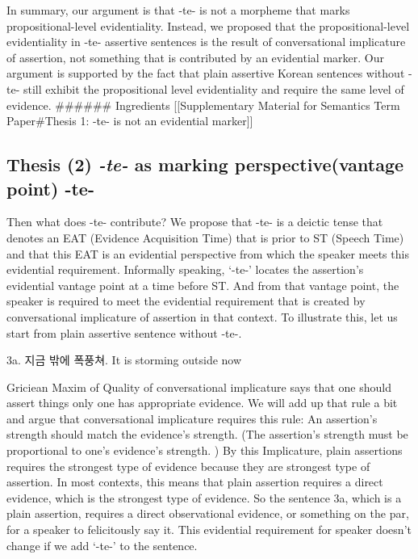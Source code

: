 In summary, our argument is that -te- is not a morpheme that marks
propositional-level evidentiality. Instead, we proposed that the
propositional-level evidentiality in -te- assertive sentences is the
result of conversational implicature of assertion, not something that is
contributed by an evidential marker. Our argument is supported by the
fact that plain assertive Korean sentences without -te- still exhibit
the propositional level evidentiality and require the same level of
evidence. \#\#\#\#\#\# Ingredients {[}{[}Supplementary Material for
Semantics Term Paper\#Thesis 1: -te- is not an evidential marker{]}{]}

\hypertarget{thesis-2--te--as-marking-perspectivevantage-point--te-}{%
\subsection{\texorpdfstring{Thesis (2) \emph{-te-} as marking
perspective(vantage point)
-te-}{Thesis (2) -te- as marking perspective(vantage point) -te-}}\label{thesis-2--te--as-marking-perspectivevantage-point--te-}}

Then what does -te- contribute? We propose that -te- is a deictic tense
that denotes an EAT (Evidence Acquisition Time) that is prior to ST
(Speech Time) and that this EAT is an evidential perspective from which
the speaker meets this evidential requirement. Informally speaking,
`-te-' locates the assertion's evidential vantage point at a time before
ST. And from that vantage point, the speaker is required to meet the
evidential requirement that is created by conversational implicature of
assertion in that context. To illustrate this, let us start from plain
assertive sentence without -te-.

3a. 지금 밖에 폭풍쳐. It is storming outside now

Griciean Maxim of Quality of conversational implicature says that one
should assert things only one has appropriate evidence. We will add up
that rule a bit and argue that conversational implicature requires this
rule: An assertion's strength should match the evidence's strength. (The
assertion's strength must be proportional to one's evidence's strength.
) By this Implicature, plain assertions requires the strongest type of
evidence because they are strongest type of assertion. In most contexts,
this means that plain assertion requires a direct evidence, which is the
strongest type of evidence. So the sentence 3a, which is a plain
assertion, requires a direct observational evidence, or something on the
par, for a speaker to felicitously say it. This evidential requirement
for speaker doesn't change if we add `-te-' to the sentence.

